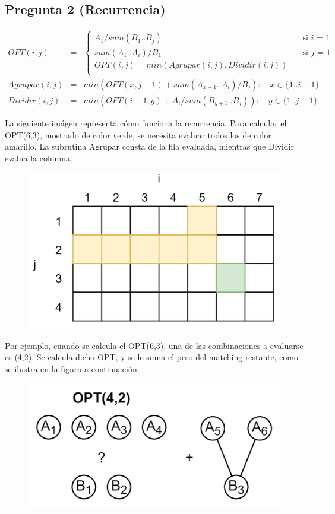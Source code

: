 \subsection*{Pregunta 2 (Recurrencia)}
\begin{eqnarray*}
OPT(i,j) &=& 
  \begin{cases}
    A_1/sum(B_1..B_j)& \quad \text{si } i  \text{ = 1}\\
    sum(A_1..A_i)/B_1 & \quad \text{si } j \text{ = 1}\\
    OPT(i,j) = min(Agrupar(i,j), Dividir(i,j))\\
  \end{cases}
\\
Agrupar(i,j)&=&min(OPT(x,j-1)+sum(A_{x+1}..A_i)/B_j)  :\quad x\in \{1..i-1\}\\
Dividir(i,j)&=&min(OPT(i-1,y)+A_i/sum(B_{y+1}..B_j)) :\quad y\in \{1..j-1\}
\end{eqnarray*}

La siguiente imágen representa cómo funciona la recurrencia. Para calcular el OPT(6,3), mostrado de color verde, se necesita evaluar todos los de color amarillo. La subrutina Agrupar consta de la fila evaluada, mientras que Dividir evalua la columna. 
\begin{figure}[h]
\includegraphics[scale=0.7]{tabla.png}
\centering
\end{figure}

Por ejemplo, cuando se calcula el OPT(6,3), una de las combinaciones a evaluarse es (4,2). Se calcula dicho OPT, y se le suma el peso del matching restante, como se ilustra en la figura a continuación.

\begin{figure}[h]
\includegraphics[scale=0.7]{ejemplo.png}
\centering
\end{figure}